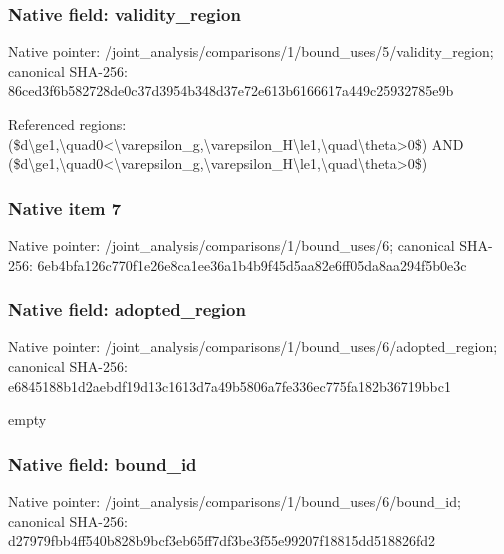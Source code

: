 \documentclass[10pt,a4paper]{article}
\begin{document}
\subsubsection{Native field: validity\_\allowbreak{}region}
Native pointer: /joint\_\allowbreak{}analysis/comparisons/1/bound\_\allowbreak{}uses/5/validity\_\allowbreak{}region; canonical SHA-256: 86ced3f6b582728de0c37d3954b348d37e72e613b6166617a449c25932785e9b

\begingroup\raggedright\sloppy Referenced regions:\allowbreak{} (\$d\textbackslash{}ge1,\allowbreak{}\textbackslash{}quad0<\textbackslash{}varepsilon\_\allowbreak{}g,\allowbreak{}\textbackslash{}varepsilon\_\allowbreak{}H\textbackslash{}le1,\allowbreak{}\textbackslash{}quad\textbackslash{}theta>0\$) AND (\$d\textbackslash{}ge1,\allowbreak{}\textbackslash{}quad0<\textbackslash{}varepsilon\_\allowbreak{}g,\allowbreak{}\textbackslash{}varepsilon\_\allowbreak{}H\textbackslash{}le1,\allowbreak{}\textbackslash{}quad\textbackslash{}theta>0\$)\par\endgroup

\subsubsection{Native item 7}
Native pointer: /joint\_\allowbreak{}analysis/comparisons/1/bound\_\allowbreak{}uses/6; canonical SHA-256: 6eb4bfa126c770f1e26e8ca1ee36a1b4b9f45d5aa82e6ff05da8aa294f5b0e3c

\subsubsection{Native field: adopted\_\allowbreak{}region}
Native pointer: /joint\_\allowbreak{}analysis/comparisons/1/bound\_\allowbreak{}uses/6/adopted\_\allowbreak{}region; canonical SHA-256: e6845188b1d2aebdf19d13c1613d7a49b5806a7fe336ec775fa182b36719bbc1

\begingroup\raggedright\sloppy empty\par\endgroup

\subsubsection{Native field: bound\_\allowbreak{}id}
Native pointer: /joint\_\allowbreak{}analysis/comparisons/1/bound\_\allowbreak{}uses/6/bound\_\allowbreak{}id; canonical SHA-256: d27979fbb4ff540b828b9bcf3eb65ff7df3be3f55e99207f18815dd518826fd2
\end{document}
